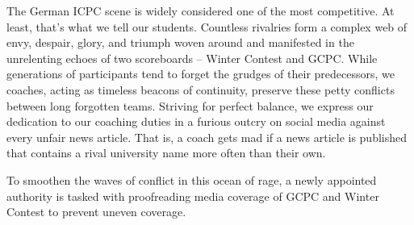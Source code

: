 

%
The German ICPC scene is widely considered one of the most competitive.
At least, that's what we tell our students.
Countless rivalries form a complex web of envy, despair, glory, and triumph woven around and manifested in the unrelenting echoes of two scoreboards -- Winter Contest and GCPC.
While generations of participants tend to forget the grudges of their predecessors, we coaches, acting as timeless beacons of continuity, preserve these petty conflicts between long forgotten teams.
Striving for perfect balance, we express our dedication to our coaching duties in a furious outcry on social media against every unfair news article.
That is, a coach gets mad if a news article is published that contains a rival university name more often than their own. 

To smoothen the waves of conflict in this ocean of rage, a newly appointed authority is tasked with proofreading media coverage of GCPC and Winter Contest to prevent uneven coverage.

%

